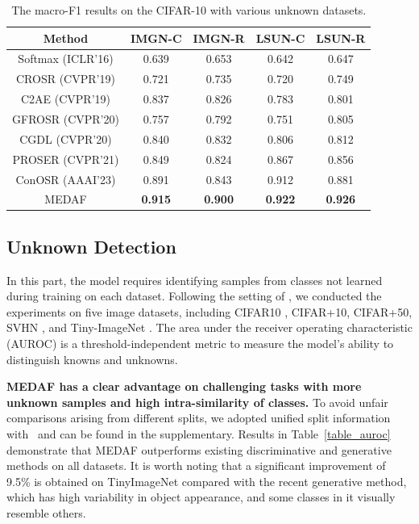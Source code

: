 \documentclass[letterpaper]{article} %
\begin{document}
\begin{table}[!ht]
\centering
\small
\setlength\tabcolsep{3pt}
\begin{tabular}{ccccc}
    \hline
    Method & IMGN-C & IMGN-R & LSUN-C & LSUN-R  \\ \hline
    Softmax (ICLR'16)& 0.639 & 0.653 & 0.642 & 0.647  \\ 
    CROSR (CVPR'19)& 0.721 & 0.735 & 0.720 & 0.749  \\ 
    C2AE (CVPR'19)& 0.837 & 0.826 & 0.783 & 0.801  \\ 
    GFROSR (CVPR'20)& 0.757 & 0.792 & 0.751 & 0.805  \\ 
    CGDL (CVPR'20)& 0.840 & 0.832 & 0.806 & 0.812  \\ 
    PROSER (CVPR'21)& 0.849 & 0.824 & 0.867 & 0.856  \\ 
    ConOSR (AAAI'23)& 0.891 & 0.843 & 0.912 & 0.881  \\ \hline
    MEDAF & \textbf{0.915} & \textbf{0.900} & \textbf{0.922} & \textbf{0.926}  \\ \hline
\end{tabular}
\caption{The macro-F1 results on the CIFAR-10 with various unknown datasets.}
\label{table_f1}
\end{table}
\subsection{Unknown Detection}
In this part, the model requires identifying samples from classes not learned during training on each dataset. Following the setting of \cite{moon2022difficulty}, we conducted the experiments on five image datasets, including CIFAR10 \cite{krizhevsky09learning}, CIFAR+10, CIFAR+50, SVHN \cite{netzer2011reading}, and Tiny-ImageNet \cite{pouransari2014tiny}. The area under the receiver operating characteristic (AUROC) is a threshold-independent metric to measure the model's ability to distinguish knowns and unknowns.

\textbf{MEDAF has a clear advantage on challenging tasks with more unknown samples and high intra-similarity of classes.} 
To avoid unfair comparisons arising from different splits, we adopted unified split information with~\cite{moon2022difficulty,neal2018open} and can be found in the supplementary. Results in Table~\ref{table_auroc} demonstrate that MEDAF outperforms existing discriminative and generative methods on all datasets. It is worth noting that a significant improvement of 9.5\% is obtained on TinyImageNet compared with the recent generative method, which has high variability in object appearance, and some classes in it visually resemble others.
\end{document}
